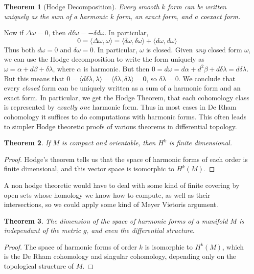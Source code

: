 \documentclass{article}
\theoremstyle{plain}
\newtheorem{theorem}{Theorem}
\theoremstyle{remark}
\theoremstyle{definition}
\begin{document}
\begin{theorem}[Hodge Decomposition]
    Every smooth $k$ form can be written uniquely as the sum of a harmonic $k$ form, an exact form, and a coexact form.
\end{theorem}

Now if $\Delta \omega = 0$, then $d \delta \omega = - \delta d \omega$. In particular,
%
\[ 0 = \langle \Delta \omega, \omega \rangle = \langle \delta \omega, \delta \omega \rangle + \langle d \omega, d \omega \rangle \]
%
Thus both $d \omega = 0$ and $\delta \omega = 0$. In particular, $\omega$ is closed. Given {\it any} closed form $\omega$, we can use the Hodge decomposition to write the form uniquely as $\omega = \alpha + d \beta + \delta \lambda$, where $\alpha$ is harmonic. But then $0 = d \omega = d \alpha + d^2 \beta + d \delta \lambda = d \delta \lambda$. But this means that $0 = \langle d \delta \lambda, \lambda \rangle = \langle \delta \lambda, \delta \lambda \rangle = 0$, so $\delta \lambda = 0$. We conclude that every {\it closed} form can be uniquely written as a sum of a harmonic form and an exact form. In particular, we get the Hodge Theorem, that each cohomology class is represented by {\it exactly one} harmonic form. Thus in most cases in De Rham cohomology it suffices to do computations with harmonic forms. This often leads to simpler Hodge theoretic proofs of various theorems in differential topology.

\begin{theorem}
    If $M$ is compact and orientable, then $H^k$ is finite dimensional.
\end{theorem}
\begin{proof}
    Hodge's theorem tells us that the space of harmonic forms of each order is finite dimensional, and this vector space is isomorphic to $H^k(M)$.
\end{proof}

A non hodge theoretic would have to deal with some kind of finite covering by open sets whose homology we know how to compute, as well as their intersections, so we could apply some kind of Meyer Vietoris argument.

\begin{theorem}
    The dimension of the space of harmonic forms of a manifold $M$ is independant of the metric $g$, and even the differential structure.
\end{theorem}
\begin{proof}
    The space of harmonic forms of order $k$ is isomorphic to $H^k(M)$, which is the De Rham cohomology and singular cohomology, depending only on the topological structure of $M$.
\end{proof}
\end{document}
